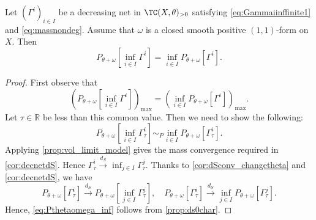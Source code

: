 \begin{lemma}\label{lma:testcurinfcompatible}
    Let $(\Gamma^i)_{i\in I}$ be a decreasing net in $\TC(X,\theta)_{>0}$ satisfying \eqref{eq:Gammaiinffinite1} and \eqref{eq:massnondeg}. Assume that $\omega$ is a closed smooth positive $(1,1)$-form on $X$. Then
    \[
    P_{\theta+\omega}\left[ \inf_{i\in I} \Gamma^{i} \right]= \inf_{i\in I} P_{\theta+\omega}\left[ \Gamma^{i} \right].
    \]
\end{lemma}
\begin{proof}
    First observe that
    \[
     \left( P_{\theta+\omega}\left[ \inf_{i\in I} \Gamma^{i} \right] \right)_{\max}= \left(\inf_{i\in I} P_{\theta+\omega}\left[ \Gamma^{i} \right]\right)_{\max}.
    \]
    Let $\tau\in \mathbb{R}$ be less than this common value. Then we need to show the following:
    \begin{equation}\label{eq:Pthetaomega_inf}
    P_{\theta+\omega}\left[ \inf_{i\in I} \Gamma^i_{\tau} \right]\sim_P \inf_{i\in I} P_{\theta+\omega}\left[  \Gamma^i_{\tau} \right].
    \end{equation}
    Applying \cref{prop:vol_limit_model} gives the mass convergence required in \cref{cor:decnetdS}. Hence $\Gamma^i_{\tau}\xrightarrow{d_S}\inf_{j\in I} \Gamma^j_{\tau} $. Thanks to \cref{cor:dSconv_changetheta} and \cref{cor:decnetdS}, we have
    \[
    P_{\theta+\omega}\left[ \Gamma^i_{\tau} \right]\xrightarrow{d_S} P_{\theta+\omega}\left[ \inf_{j\in I} \Gamma^j_{\tau} \right],\quad P_{\theta+\omega}\left[ \Gamma^i_{\tau} \right]\xrightarrow{d_S}  \inf_{j\in I} P_{\theta+\omega}\left[  \Gamma^j_{\tau} \right].
    \]
    Hence, \eqref{eq:Pthetaomega_inf} follows from \cref{prop:ds0char}.
\end{proof}



%
